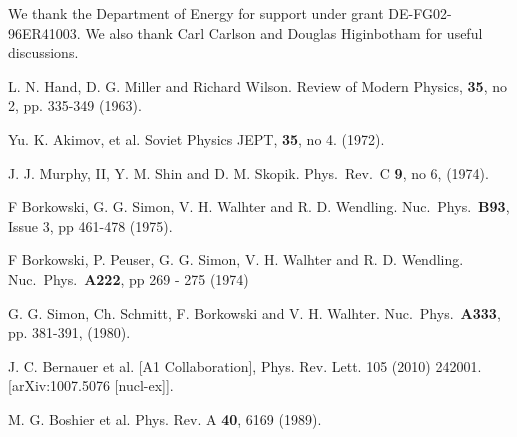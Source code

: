 \documentclass[aps,prd,twocolumn,groupedaddress,10pt]{revtex4-1}
\begin{document}
\begin{acknowledgments}
We thank the Department of Energy for support under grant DE-FG02-96ER41003. We also thank Carl Carlson and Douglas Higinbotham for useful discussions.
\end{acknowledgments}

\begin{thebibliography}{99}

  
  L. N. Hand, D. G. Miller and Richard Wilson.
  Review of Modern Physics, {\bf 35}, no 2, pp. 335-349 (1963).
  
  Yu. K. Akimov, et al.
  Soviet Physics JEPT, {\bf 35}, no 4. (1972).
  
  J. J. Murphy, II, Y. M. Shin and D. M. Skopik.
  Phys.\ Rev.\ C {\bf 9}, no 6, (1974).
  
  F Borkowski, G. G. Simon, V. H. Walhter and R. D. Wendling.
  Nuc.\ Phys.\ {\bf B93}, Issue 3, pp 461-478 (1975).
  
    F Borkowski, P. Peuser, G. G. Simon, V. H. Walhter and R. D. Wendling.
   Nuc.\ Phys.\ {\bf A222}, pp 269 - 275 (1974)
  
  G. G. Simon, Ch. Schmitt, F. Borkowski and V. H. Walhter.
  Nuc.\ Phys.\ {\bf A333}, pp. 381-391, (1980).
  
  J. C. Bernauer et al. [A1 Collaboration], Phys. Rev. Lett. 105
  (2010) 242001. [arXiv:1007.5076 [nucl-ex]].
 
  M. G. Boshier et al. Phys. Rev. A {\bf40}, 6169 (1989).
  

\end{thebibliography}
\end{document}
